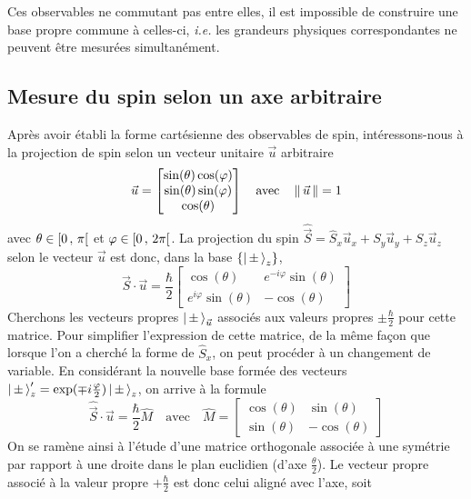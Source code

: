         Ces observables ne commutant pas entre elles, il est impossible de construire une base propre commune à celles-ci, \textit{i.e.} les grandeurs physiques correspondantes ne peuvent être mesurées simultanément.

    \subsection{Mesure du spin selon un axe arbitraire}

        Après avoir établi la forme cartésienne des observables de spin, intéressons-nous à la projection de spin selon un vecteur unitaire $\vec{u}$ arbitraire 
        \[ \vec{u} = \begin{bmatrix}
            \sin(\theta) \cos(\varphi) \\
            \sin(\theta) \sin(\varphi) \\
            \cos(\theta)
        \end{bmatrix} \quad \text{avec} \quad \left\lVert \, \vec{u} \, \right\rVert = 1 \]
        avec $\theta \in \left[ 0 \, , \, \pi \right[$ et $\varphi \in \left[ 0 \, , \, 2\pi \right[$. La projection du spin $\hat{\vec{S}} = \hat{S}_x \vec{u}_x + S_y \vec{u}_y + S_z \vec{u}_z$ selon le vecteur $\vec{u}$ est donc, dans la base $\left\{\left| \, \pm \, \right>_z\right\}$,
        \[ \hat{\vec{S}} \cdot \vec{u} = \frac{\hbar}{2}\begin{bmatrix}
            \cos(\theta) & e^{-i\varphi} \sin(\theta) \\
            e^{i\varphi} \sin(\theta) & - \cos(\theta)
        \end{bmatrix} \]
        Cherchons les vecteurs propres $\left| \, \pm \, \right>_{\vec{u}}$ associés aux valeurs propres $\pm \frac{\hbar}{2}$ pour cette matrice. Pour simplifier l’expression de cette matrice, de la même façon que lorsque l’on a cherché la forme de $\hat{S}_x$, on peut procéder à un changement de variable. En considérant la nouvelle base formée des vecteurs $\left| \, \pm \, \right>_z' = \exp(\mp i \frac{\varphi}{2}) \left| \, \pm \, \right>_z$, on arrive à la formule
        \[ \hat{\vec{S}} \cdot \vec{u} = \frac{\hbar}{2} \hat{M} \quad \text{avec} \quad \hat{M} = \begin{bmatrix}
            \cos(\theta) & \sin(\theta) \\
            \sin(\theta) & -\cos(\theta)
        \end{bmatrix} \]
        On se ramène ainsi à l’étude d’une matrice orthogonale associée à une symétrie par rapport à une droite dans le plan euclidien (d’axe $\frac{\theta}{2}$). Le vecteur propre associé à la valeur propre $+\frac{\hbar}{2}$ est donc celui aligné avec l’axe, soit
